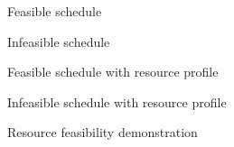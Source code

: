 \documentclass{article}
\begin{document}
\begin{figure}[ht]
	\centering
	
	\caption{Feasible schedule}
	\label{fig:activity_graph}
\end{figure}

\begin{figure}[ht]
	\centering
	
	\caption{Infeasible schedule}
	\label{fig:activity_graph}
\end{figure}

\begin{figure}[ht]
	\centering
	
	\caption{Feasible schedule with resource profile}
	\label{fig:activity_graph}
\end{figure}

\begin{figure}[ht]
	\centering
	
	\caption{Infeasible schedule with resource profile}
	\label{fig:activity_graph}
\end{figure}

\begin{figure}[ht]
	\makebox[\textwidth][c]{
		
	}
	\caption{Resource feasibility demonstration}
	\label{fig:activity_graph}
\end{figure}
\end{document}
